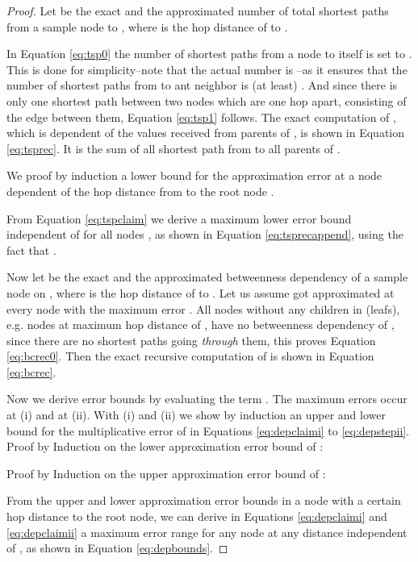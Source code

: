 \documentclass[11pt]{article}
\newcommand{\todoI}[1]{}\newcommand{\blueI}[1]{}
\begin{document}
\begin{proof}
Let  be the exact and  the approximated number of total shortest paths from a sample node  to , where  is the hop distance of  to .

In Equation \eqref{eq:tsp0} the number of shortest paths from a node  to itself is set to . This is done for simplicity--note that the actual number is --as it ensures that the number of shortest paths from  to ant neighbor is (at least) . And since there is only one shortest path between two nodes which are one hop apart, consisting of the edge between them, Equation \eqref{eq:tsp1} follows.
The exact computation of , which is dependent of the values received from parents of , is shown in Equation \eqref{eq:tsprec}. It is the sum of all shortest path from  to all parents of .



We proof by induction a lower bound for the approximation error at a node  dependent of the hop distance  from  to the root node .




From Equation \eqref{eq:tspclaim} we derive a maximum lower error bound independent of  for all nodes , as shown in Equation \eqref{eq:tsprecappend}, using the fact that .




Now let  be the exact and  the approximated betweenness dependency of a sample node  on , where  is the hop distance of  to . Let us assume  got approximated at every node with the maximum error .
All nodes without any children in  (leafs), e.g. nodes at maximum hop distance of , have no betweenness dependency of , since there are no shortest paths going \textit{through} them, this proves Equation \eqref{eq:bcrec0}.
Then the exact recursive computation of  is shown in Equation \eqref{eq:bcrec}.




Now we derive error bounds by evaluating the term . The maximum errors occur at (i) and at (ii).
With (i) and (ii) we show by induction an upper and lower bound for the multiplicative error of  in Equations \eqref{eq:depclaimi} to \eqref{eq:depstepii}.
\newline\newline
Proof by Induction on the lower approximation error bound of :

\newline
Proof by Induction on the upper approximation error bound of :


From the upper and lower approximation error bounds in a node  with a certain hop distance  to the root node, we can derive in Equations \eqref{eq:depclaimi} and \eqref{eq:depclaimii} a maximum error range for any node at any distance independent of , as shown in Equation \eqref{eq:depbounds}.
\todoI{ is later }



\end{proof}
\end{document}
